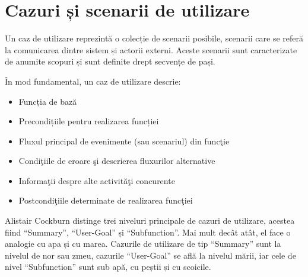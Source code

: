 \documentclass[12pt,a4paper]{report}
\begin{document}
\section{Cazuri și scenarii de utilizare}
\par
Un caz de utilizare reprezintă o colecție de scenarii posibile, scenarii care se referă la comunicarea dintre sistem și actorii externi. Aceste scenarii sunt caracterizate de anumite scopuri și sunt definite drept secvențe de pași.
\\ \par
În mod fundamental, un caz de utilizare descrie: 
\begin{itemize}
    \item Funcția de bază
    \item Precondițiile pentru realizarea funcției
    \item Fluxul principal de evenimente (sau scenariul) din funcţie
    \item Condiţiile de eroare şi descrierea fluxurilor alternative
    \item Informaţii despre alte activităţi concurente
    \item Postcondiţiile determinate de realizarea funcţiei
\end{itemize}
\bigskip
\par
Alistair Cockburn distinge trei niveluri principale de cazuri de utilizare, acestea fiind “Summary”, “User-Goal” și “Subfunction”. Mai mult decât atât, el face o analogie cu apa și cu marea. Cazurile de utilizare de tip “Summary” sunt la nivelul de nor sau zmeu, cazurile “User-Goal” se află la nivelul mării, iar cele de nivel “Subfunction” sunt sub apă, cu peștii și cu scoicile\cite{usecases}. 
\newpage
\end{document}
